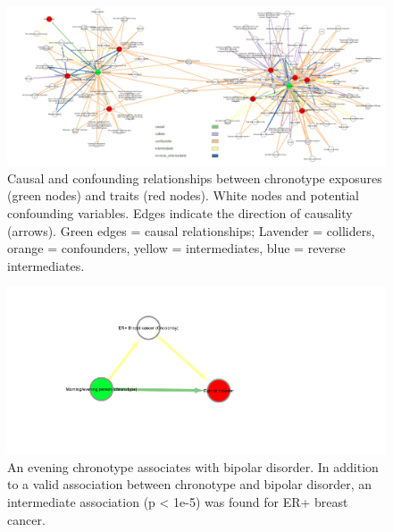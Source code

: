 \documentclass[journal,article,submit,moreauthors,pdftex]{Definitions/mdpi}
\begin{document}
\begin{figure}[htbp]
	\centering
	\includegraphics[width=\linewidth]{Figs/Analysis3/gBig.png}
	\caption{Causal and confounding relationships between chronotype exposures (green nodes) and traits (red nodes). White nodes and potential confounding variables. Edges indicate the direction of causality (arrows). Green edges = causal relationships; Lavender = colliders, orange = confounders, yellow = intermediates, blue = reverse intermediates.}
	\label{gBig}
\end{figure}

\begin{figure}[htbp]
	\centering
	\includegraphics[width=0.7\linewidth]{Figs/Analysis3/morning_bipolar.png}
	\caption{An evening chronotype associates with bipolar disorder. In addition to a valid association between chronotype and bipolar disorder, an intermediate association (p < 1e-5) was found for ER+ breast cancer.}
	\label{chronoBipolar}
\end{figure}
\end{document}
